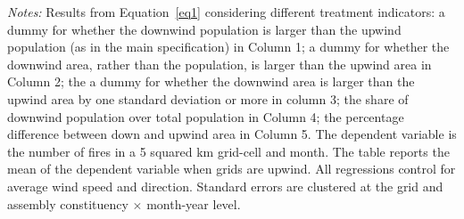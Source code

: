 \documentclass[12pt]{article}
\let\SourceInput
\renewcommand{}[1]{%
  \IfFileExists{../../#1}{\SourceInput{../../#1}}{%
    \IfFileExists{../../#1.tex}{\SourceInput{../../#1.tex}}{%
      \fbox{\scriptsize Missing table: \detokenize{#1}}}}}
\begin{document}
 \begin{table}[htbp!]
     \centering
     \caption{Effect of constituency exposure to smoke on number of fires, robustness by treatment indicator \label{tab:main_by_treat}}
     \resizebox{0.8\textwidth}{!}{
      
      }
      \begin{minipage}{\textwidth}
         {\small \textit{Notes: }Results from Equation~\ref{eq1} considering different treatment indicators: a dummy for whether the downwind population is larger than the upwind population (as in the main specification) in Column 1; a dummy for whether the downwind area, rather than the population, is larger than the upwind area in Column 2; the a dummy for whether the downwind area is larger than the upwind area by one standard deviation or more in column 3; the share of downwind population over total population in Column 4; the percentage difference between down and upwind area in Column 5. The dependent variable is the number of fires in a 5 squared km grid-cell and month. 
         The table reports the mean of the dependent variable when grids are upwind. All regressions control for average wind speed and direction. Standard errors are clustered at the grid and assembly constituency $\times$ month-year level. }
     \end{minipage}
 \end{table}




 \begin{table}[htbp!]
     \centering
     \caption{Effect of constituency exposure to smoke on number of fires, robustness by treatment indicator \label{tab:main_by_treat}}
     \resizebox{0.8\textwidth}{!}{
      
      }

 \end{table}


 \begin{table}[htbp!]
     \centering
     \caption{Effect of constituency exposure to smoke on number of fires, robustness by treatment indicator \label{tab:main_by_treat}}
     \resizebox{0.8\textwidth}{!}{
      
      }
  
 \end{table}
\end{document}
